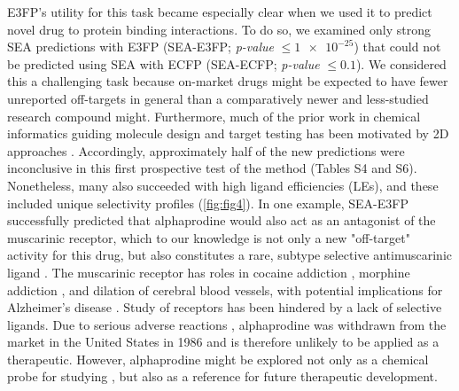 \documentclass[../../main.tex]{subfiles}
\begin{document}
\begin{refsection}
	E3FP's utility for this task became especially clear when we used it to predict novel drug to protein binding interactions.
	To do so, we examined only strong SEA predictions with E3FP (SEA-E3FP;   \emph{p-value} $\le \num{1e-25}$) that could not be predicted using SEA with ECFP (SEA-ECFP; \emph{p-value} $\le 0.1$).
	We considered this a challenging task because on-market drugs might be expected to have fewer unreported off-targets in general than a comparatively newer and less-studied research compound might.
	Furthermore, much of the prior work in chemical informatics guiding molecule design and target testing has been motivated by 2D approaches \supercite{nicholls_2010,maggiora_2014,cleves_2008}.
	Accordingly, approximately half of the new predictions were inconclusive in this first prospective test of the method (Tables S4 and S6).
	Nonetheless, many also succeeded with high ligand efficiencies (LEs), and these included unique selectivity profiles (\cref{fig:fig4}).
	In one example, SEA-E3FP successfully predicted that alphaprodine would also act as an antagonist of the  muscarinic receptor, which to our knowledge is not only a new "off-target" activity for this drug, but also constitutes a rare, subtype selective  antimuscarinic ligand \supercite{gentry_2014}.
	The  muscarinic receptor has roles in cocaine addiction \supercite{finkjensen_2003}, morphine addiction \supercite{basile_2002}, and dilation of cerebral blood vessels, with potential implications for Alzheimer's disease  \supercite{yamada_2001}.
	Study of  receptors has been hindered by a lack of selective ligands.
	Due to serious adverse reactions \supercite{chen_1982}, alphaprodine was withdrawn from the market in the United States in 1986 and is therefore unlikely to be applied as a therapeutic.
	However, alphaprodine might be explored not only as a chemical probe for studying , but also as a reference for future therapeutic development.


\end{refsection}
\end{document}
